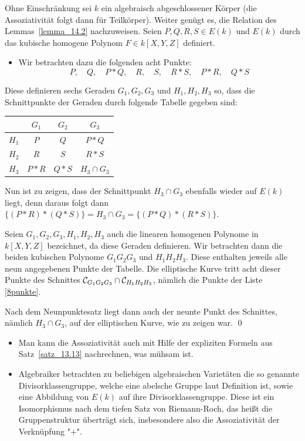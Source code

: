\begin{bew}
	Ohne Einschränkung sei $k$ ein algebraisch abgeschlossener Körper (die Assoziativität folgt dann für Teilkörper).
	Weiter genügt es, die Relation des Lemmas~\ref{lemma_14.2} nachzuweisen.
	Seien $P,Q,R,S \in E(k)$ und $E(k)$ durch das kubische homogene Polynom $F \in k[X,Y,Z]$ definiert.
	\begin{itemize}
		\item Wir betrachten dazu die folgenden acht Punkte:
		\begin{equation}
			P, \quad Q, \quad P*Q,\quad R,\quad S,\quad R*S,\quad P*R,\quad Q*S \label{8punkte} \tag{\#}
		\end{equation}
	\end{itemize}
	Diese definieren sechs Geraden $G_1,G_2,G_3$ und $H_1,H_2,H_3$ so, dass die Schnittpunkte der Geraden durch folgende Tabelle gegeben sind:
	\begin{center}
		\begin{tabular}{c|ccc}
		& $G_1$ & $G_2$ & $G_3$ \\ 
		\hline $H_1$ & $P$ & $Q$ & $P*Q$ \\ 
		$H_2$ & $R$ & $S$ & $R*S$ \\ 
		$H_3$ & $P*R$ & $Q*S$ & $H_3 \cap G_3$
		\end{tabular}
	\end{center}
	Nun ist zu zeigen, dass der Schnittpunkt $H_3 \cap G_3$ ebenfalls wieder auf $E(k)$ liegt, denn daraus folgt dann $\{(P*R)*(Q*S)\} = H_3 \cap G_3 = \{(P*Q)*(R*S)\}$.
	\item Seien $G_1,G_2,G_3,H_1,H_2,H_3$ auch die linearen homogenen Polynome in $k[X,Y,Z]$ bezeichnet, da diese Geraden definieren.
	Wir betrachten dann die beiden kubischen Polynome $G_1G_2G_3$ und $H_1H_2H_3$.
	Diese enthalten jeweils alle neun angegebenen Punkte der Tabelle.
	Die elliptische Kurve tritt acht dieser Punkte des Schnittes $\mathcal{C}_{G_1G_2G_3} \cap \mathcal{C}_{H_1H_2H_3}$, nämlich die Punkte der Liste \eqref{8punkte}.
	\item Nach dem Neunpunktesatz liegt dann auch der neunte Punkt des Schnittes, nämlich $H_3 \cap G_3$, auf der elliptischen Kurve, wie zu zeigen war. \qed
\end{bew}

\begin{bem}
	\begin{itemize}
		\item Man kann die Assoziativität auch mit Hilfe der expliziten Formeln aus Satz~\ref{satz_13.13} nachrechnen, was mühsam ist.
		\item Algebraiker betrachten zu beliebigen algebraischen Varietäten die so genannte Divisorklassengruppe, welche eine abelsche Gruppe laut Definition ist, sowie eine Abbildung von $E(k)$ auf ihre Divisorklassengruppe.
		Diese ist ein Isomorphismus nach dem tiefen Satz von Riemann-Roch, das heißt die Gruppenstruktur überträgt sich, insbesondere also die Assoziativität der Verknüpfung "$+$".
	\end{itemize}
\end{bem}

